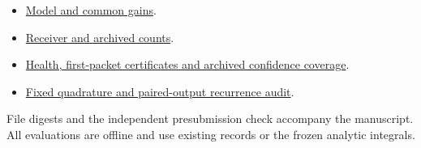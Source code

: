 \begin{itemize}
 \item \href{https://github.com/center-666/paperlast/tree/b1509be0265ecd0512befe999847fa5908087872/common_g_reference_revision_20261115/inputs}{Model and common gains}.
 \item \href{https://github.com/center-666/paperlast/tree/b1509be0265ecd0512befe999847fa5908087872/JFI_secure_estimation_accuracy_safety_frontier}{Receiver and archived counts}.
 \item \href{https://github.com/center-666/paperlast/tree/b1509be0265ecd0512befe999847fa5908087872/JFI_A0_safety_accuracy_theorem_review}{Health, first-packet certificates and archived confidence coverage}.
 \item \href{https://github.com/center-666/paperlast/tree/b1509be0265ecd0512befe999847fa5908087872/JFI_A0_direct_joint_risk_feasibility}{Fixed quadrature and paired-output recurrence audit}.
\end{itemize}
File digests and the independent presubmission check accompany the manuscript. All evaluations are offline and use existing records or the frozen analytic integrals.
